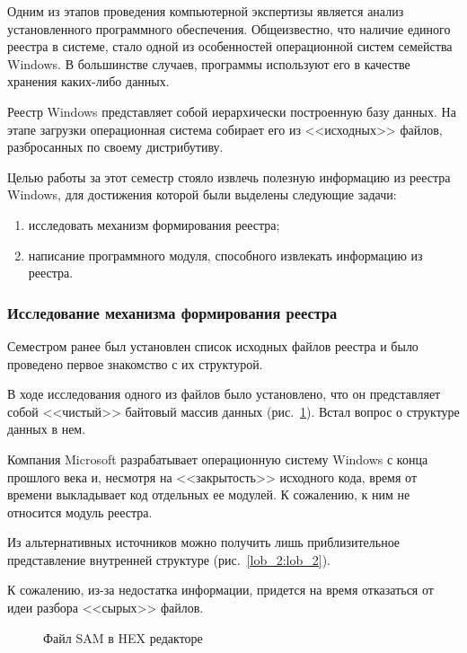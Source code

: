 Одним из этапов проведения компьютерной экспертизы является анализ установленного программного обеспечения. Общеизвестно, что наличие единого реестра в системе, стало одной из особенностей операционной систем семейства Windows. В большинстве случаев, программы используют его в качестве хранения каких-либо данных.

Реестр Windows представляет собой иерархически построенную базу данных. На этапе загрузки операционная система собирает его из <<исходных>> файлов, разбросанных по своему дистрибутиву.

Целью работы за этот семестр стояло извлечь полезную информацию из реестра Windows, для достижения которой были выделены следующие задачи:

\begin{enumerate}
  \item исследовать механизм формирования реестра;
  \item написание программного модуля, способного извлекать информацию из реестра.
\end{enumerate}

\subsubsection{Исследование механизма формирования реестра}

Семестром ранее был установлен список исходных файлов реестра и было проведено первое знакомство с их структурой.

В ходе исследования одного из файлов было установлено, что он представляет собой <<чистый>> байтовый массив данных (рис.~\ref{lob_1:lob_1}). Встал вопрос о структуре данных в нем.

Компания Microsoft разрабатывает операционную систему Windows с конца прошлого века и, несмотря на <<закрытость>> исходного кода, время от времени выкладывает код отдельных ее модулей. \cite{registry} К сожалению, к ним не относится модуль реестра.

Из альтернативных источников можно получить лишь приблизительное представление внутренней структуре (рис.~\ref{lob_2:lob_2}). \cite{msdn}

К сожалению, из-за недостатка информации, придется на время отказаться от идеи разбора <<сырых>> файлов.

\begin{figure}[h!]
\caption{Файл SAM в HEX редакторе}
\label{lob_1:lob_1}
\end{figure} 

